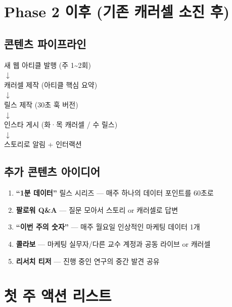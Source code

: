 \documentclass[11pt, a4paper]{article}
\begin{document}

\section{Phase 2 이후 (기존 캐러셀 소진 후)}

\subsection{콘텐츠 파이프라인}

\begin{center}
새 웹 아티클 발행 (주 1\textasciitilde 2회) \\
$\downarrow$ \\
캐러셀 제작 (아티클 핵심 요약) \\
$\downarrow$ \\
릴스 제작 (30초 훅 버전) \\
$\downarrow$ \\
인스타 게시 (화·목 캐러셀 / 수 릴스) \\
$\downarrow$ \\
스토리로 알림 + 인터랙션
\end{center}

\subsection{추가 콘텐츠 아이디어}
\begin{enumerate}[leftmargin=2em]
  \item \textbf{``1분 데이터''} 릴스 시리즈 — 매주 하나의 데이터 포인트를 60초로
  \item \textbf{팔로워 Q\&A} — 질문 모아서 스토리 or 캐러셀로 답변
  \item \textbf{``이번 주의 숫자''} — 매주 월요일 인상적인 마케팅 데이터 1개
  \item \textbf{콜라보} — 마케팅 실무자/다른 교수 계정과 공동 라이브 or 캐러셀
  \item \textbf{리서치 티저} — 진행 중인 연구의 중간 발견 공유
\end{enumerate}


\section{첫 주 액션 리스트}
\end{document}

